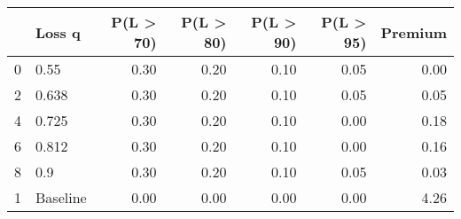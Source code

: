 \begin{tabular}{llrrrrr}
\toprule
{} &    Loss q &  P(L > 70) &  P(L > 80) &  P(L > 90) &  P(L > 95) &  Premium \\
\midrule
0 &      0.55 &       0.30 &       0.20 &       0.10 &       0.05 &     0.00 \\
2 &     0.638 &       0.30 &       0.20 &       0.10 &       0.05 &     0.05 \\
4 &     0.725 &       0.30 &       0.20 &       0.10 &       0.00 &     0.18 \\
6 &     0.812 &       0.30 &       0.20 &       0.10 &       0.00 &     0.16 \\
8 &       0.9 &       0.30 &       0.20 &       0.10 &       0.05 &     0.03 \\
1 &  Baseline &       0.00 &       0.00 &       0.00 &       0.00 &     4.26 \\
\bottomrule
\end{tabular}
